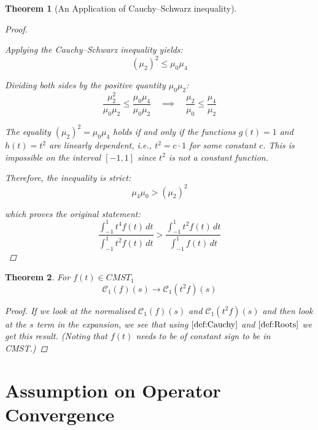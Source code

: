 \documentclass[11pt]{article}
\theoremstyle{breakdef}
\newtheorem{theorem}{Theorem}[section]
\begin{document}
\begin{theorem}[An Application of Cauchy--Schwarz inequality]
\begin{proof}
\begin{itemize}
\end{itemize}
Applying the Cauchy--Schwarz inequality yields:
\begin{equation}
(\mu_2)^2 \le \mu_0 \mu_4
\end{equation}

Dividing both sides by the positive quantity $\mu_0 \mu_2$:
\begin{equation}
\frac{\mu_2^2}{\mu_0 \mu_2} \le \frac{\mu_0 \mu_4}{\mu_0 \mu_2} \quad \implies \quad \frac{\mu_2}{\mu_0} \le \frac{\mu_4}{\mu_2}
\end{equation}

The equality $(\mu_2)^2 = \mu_0 \mu_4$ holds if and only if the functions $g(t)=1$ and $h(t)=t^2$ are linearly dependent, i.e., $t^2 = c \cdot 1$ for some constant $c$. This is impossible on the interval $[-1, 1]$ since $t^2$ is not a constant function. \newline

Therefore, the inequality is strict:
\begin{equation}
\mu_4 \mu_0 > (\mu_2)^2
\end{equation}

which proves the original statement:
\begin{equation}
\frac{\int_{-1}^1 t^4 f(t) \, dt}{\int_{-1}^1 t^2 f(t) \, dt} > \frac{\int_{-1}^1 t^2 f(t) \, dt}{\int_{-1}^1 f(t) \, dt}
\end{equation}



\end{proof}
\end{theorem}

\begin{theorem}
For $f(t) \in CMST_1$ 
\begin{equation}
\mathcal{C}_{1}(f)(s) \to \mathcal{C}_{1}(t^2 f)(s)
\end{equation}


\begin{proof}
If we look at the normalised $\mathcal{C}_{1}(f)(s)$ and $\mathcal{C}_{1}(t^2 f)(s)$
and then look at the $s$ term in the expansion, we see that using $\cref{def:Cauchy}$ and $\cref{def:Roots}$ we get this result. (Noting that $f(t)$ needs to be of constant sign to be in CMST.)
\end{proof}
\end{theorem}

\section{Assumption on Operator Convergence}
\label{sec:convergence_assumption}
\end{document}
